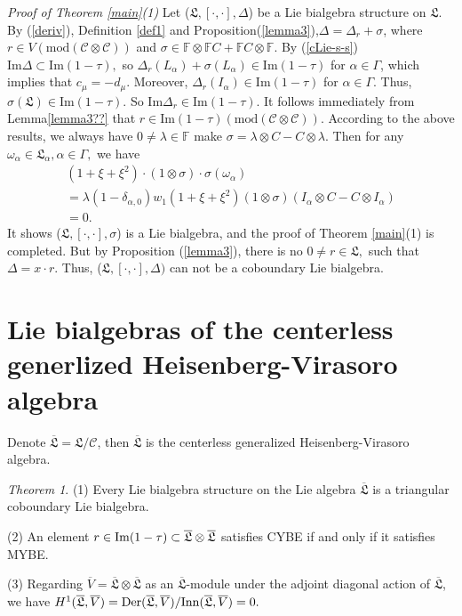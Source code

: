 \documentclass{amsart}
\theoremstyle{definition}
\theoremstyle{remark}
\numberwithin{equation}{subsection}
\numberwithin{equation}{section}
\newtheorem{theo}{Theorem}[section]
\begin{document}
 {\noindent}{\it Proof of Theorem \ref{main}(1)}
Let ($\mathfrak{L} ,[\cdot,\cdot],{\Delta}$) be a Lie bialgebra structure
on $\mathfrak{L}$. By  (\ref{deriv}), Definition \ref{def1} and
Proposition(\ref{lemma3}),$\Delta=\Delta_r+\sigma$, where $r\in
V(\mathrm{mod} (\mathcal {C}\otimes \mathcal {C}))$ and $\sigma \in
\mathbb{F}\otimes \mathbb{F}C+\mathbb{F}C \otimes \mathbb{F}$. By
(\ref{cLie-s-s}) $\mathrm{Im}\Delta \subset \mathrm{Im}(1-\tau),$ so
$\Delta_r(L_\alpha)+\sigma (L_\alpha)\in \mathrm{Im}(1-\tau)$ for
$\alpha \in \Gamma$, which implies that $c_\mu=-d_\mu$.  Moreover,
$\Delta_r(I_\alpha) \in \mathrm{Im}(1-\tau)$ for  $\alpha\in
\Gamma$. Thus, $\sigma (\mathfrak{L})\in \mathrm{Im}(1-\tau)$. So
$\mathrm{Im} \Delta_r \in \mathrm{Im}(1-\tau)$. It follows
immediately from Lemma\ref{lemma3??} that $r\in
\mathrm{Im}(1-\tau)(\mathrm{mod} (\mathcal {C}\otimes \mathcal
{C}))$. According to the above results,  we always have $0\neq
\lambda \in \mathbb{F}$ make $\sigma =\lambda \otimes C-C\otimes
\lambda.$ Then for any $\omega_\alpha \in \mathfrak{L}_\alpha,\alpha
\in \Gamma,$ we have
$$\begin{array}{l}
(1+\xi+\xi^2)\cdot (1\otimes \sigma)\cdot \sigma(\omega_\alpha)   \\[12pt]
 =\lambda(1-\delta_{\alpha,0})w_1(1+\xi+\xi^2)(1\otimes \sigma)(I_\alpha \otimes C-C\otimes
 I_\alpha)   \\[12pt]
 =0.
 \end{array}$$
It shows ($\mathfrak{L} ,[\cdot,\cdot],\sigma$) is a Lie bialgebra,
and the proof of Theorem \ref{main}(1) is completed. But by
Proposition (\ref{lemma3}), there is no $0\neq r\in \mathfrak{L},$
such that $\Delta=x\cdot r.$ Thus, ($\mathfrak{L}
,[\cdot,\cdot],{\Delta})$ can not be a coboundary
 Lie bialgebra.

\section{Lie bialgebras of the centerless generlized
Heisenberg-Virasoro algebra}

\setcounter{section}{3} \setcounter{theo}{0}\setcounter{equation}{0}

Denote $\overline{\mathfrak{L}}=\mathfrak{L}/\mathcal {C}$, then
$\overline{\mathfrak{L}}$ is the centerless generalized
Heisenberg-Virasoro algebra.

\begin{theo}
 \label{main2} {\rm(1)} Every Lie bialgebra structure on the Lie
 algebra $\overline{\mathfrak{L}} $ is a triangular coboundary Lie
 bialgebra.

 {\rm(2)} An element $r \in {{\rm Im}}(1 - \tau) \subset
 {\overline{\mathfrak{L}}}\otimes \overline{{\mathfrak{L}}} $
  satisfies CYBE if and only if it
 satisfies MYBE.

 {\rm(3)} Regarding $\overline{V}=\overline{{\mathfrak{L}} }\otimes \overline{{\mathfrak{L}}}$ as an
 $\overline{{\mathfrak{L}}}$-module under the adjoint diagonal action of
 $\overline{{\mathfrak{L}}} $, we have $H^1(\overline{{\mathfrak{L}} }
 ,\overline{V})={{\rm Der}}(\overline{{\mathfrak{L}}} ,\overline{V})/{{\rm Inn}}(\overline{{\mathfrak{L}}} ,\overline{V})=0.$
\end{theo}
  \vskip10pt
\end{document}
